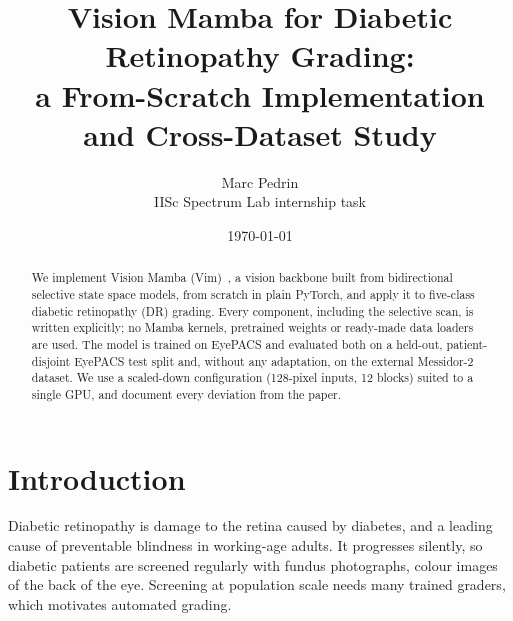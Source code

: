 \documentclass[11pt,a4paper]{article}
\title{Vision Mamba for Diabetic Retinopathy Grading:\\
       a From-Scratch Implementation and Cross-Dataset Study}
\author{Marc Pedrin\\IISc Spectrum Lab internship task}
\date{\today}
\begin{document}
\maketitle

\begin{abstract}
We implement Vision Mamba (Vim)~\cite{zhu2024vim}, a vision backbone built from
bidirectional selective state space models, from scratch in plain PyTorch, and apply
it to five-class diabetic retinopathy (DR) grading. Every component, including the
selective scan, is written explicitly; no Mamba kernels, pretrained weights or
ready-made data loaders are used. The model is trained on EyePACS and evaluated both
on a held-out, patient-disjoint EyePACS test split and, without any adaptation, on
the external Messidor-2 dataset. We use a scaled-down configuration (128-pixel
inputs, 12 blocks) suited to a single GPU, and document every deviation from the
paper. %
\end{abstract}

\section{Introduction}

Diabetic retinopathy is damage to the retina caused by diabetes, and a leading cause
of preventable blindness in working-age adults. It progresses silently, so
diabetic patients are screened regularly with fundus photographs, colour images of
the back of the eye. Screening at population scale needs many trained graders,
which motivates automated grading.
\end{document}
